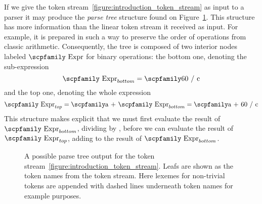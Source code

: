 \documentclass[
  oneside,
  english,
  coorientadorbanca,
  noabntexcite
]{ufsc-thesis-rn46-2019}
\newcommand{\codett}[1]{\text{\scpfamily#1}}
\newcommand{\code}[1]{\text{\scpfamily\setlength\spaceskip{0.35em}#1}}
\newcommand{\bnfvar}[1]{\codett{#1}}
\newcommand{\bnfter}[1]{\textrm{`}\codett{#1}\textrm{'}}
\begin{document}
If we give the token stream~\eqref{figure:introduction_token_stream} as input to a parser it may produce the \textit{parse tree} structure found on Figure~\ref{figure:introduction_ast}.
This structure has more information than the linear token stream it received as input.
For example, it is prepared in such a way to preserve the order of operations from classic arithmetic.
Consequently, the tree is composed of two interior nodes labeled $\bnfvar{Expr}$ for binary operations: the bottom one, denoting the sub-expression
\begin{equation*}
  \bnfvar{Expr}_{bottom} = \code{60 / c}
\end{equation*}
and the top one, denoting the whole expression
\begin{equation*}
  \bnfvar{Expr}_{top} = \code{a + $\bnfvar{Expr}_{bottom}$} = \code{a + 60 / c}
\end{equation*}
This structure makes explicit that we must first evaluate the result of $\bnfvar{Expr}_{bottom}$, dividing \codett{60} by \codett{c}, before we can evaluate the result of $\bnfvar{Expr}_{top}$, adding \codett{a} to the result of $\bnfvar{Expr}_{bottom}$.

\begin{figure}[ht]
  \centering
  \caption{
    A possible parse tree output for the token stream~\eqref{figure:introduction_token_stream}.
    Leafs are shown as the token names from the token stream.
    Here lexemes for non-trivial tokens are appended with dashed lines underneath token names for example purposes.
  }\label{figure:introduction_ast}
\end{figure}
\end{document}
